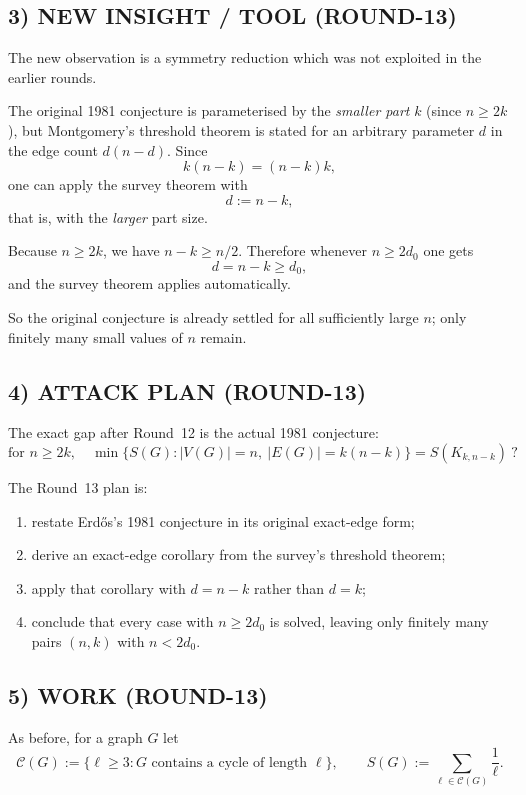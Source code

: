 \subsection*{3) NEW INSIGHT / TOOL (ROUND-13)}

The new observation is a symmetry reduction which was not exploited in the earlier rounds.

The original 1981 conjecture is parameterised by the \emph{smaller part} $k$ (since $n\ge 2k$), but Montgomery's threshold theorem is stated for an arbitrary parameter $d$ in the edge count $d(n-d)$. Since
\[
k(n-k)=(n-k)k,
\]
one can apply the survey theorem with
\[
d:=n-k,
\]
that is, with the \emph{larger} part size.

Because $n\ge 2k$, we have $n-k\ge n/2$. Therefore whenever $n\ge 2d_0$ one gets
\[
d=n-k\ge d_0,
\]
and the survey theorem applies automatically.

So the original conjecture is already settled for all sufficiently large $n$; only finitely many small values of $n$ remain.

\subsection*{4) ATTACK PLAN (ROUND-13)}

The exact gap after Round~12 is the actual 1981 conjecture:
\[
\text{for }n\ge 2k,\quad \min\{S(G): |V(G)|=n,\ |E(G)|=k(n-k)\}=S(K_{k,n-k})\ ?
\]

The Round~13 plan is:
\begin{enumerate}
\item restate Erd\H{o}s's 1981 conjecture in its original exact-edge form;
\item derive an exact-edge corollary from the survey's threshold theorem;
\item apply that corollary with $d=n-k$ rather than $d=k$;
\item conclude that every case with $n\ge 2d_0$ is solved, leaving only finitely many pairs $(n,k)$ with $n<2d_0$.
\end{enumerate}

\subsection*{5) WORK (ROUND-13)}

As before, for a graph $G$ let
\[
\mathcal C(G):=\{\ell\ge 3 : \text{$G$ contains a cycle of length $\ell$}\},
\qquad
S(G):=\sum_{\ell\in\mathcal C(G)}\frac1\ell.
\]

